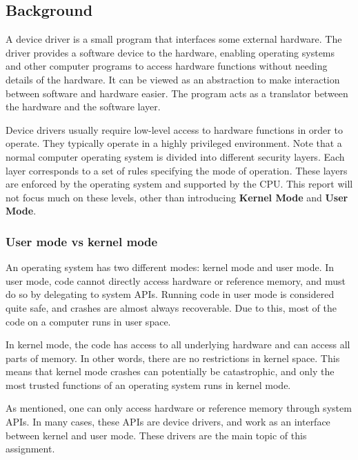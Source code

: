 \subsection{Background}
A device driver is a small program that interfaces some external hardware. The driver provides a software device to the hardware, enabling operating systems and other computer programs to access hardware functions without needing details of the hardware. It can be viewed as an abstraction to make interaction between software and hardware easier. The program acts as a translator between the hardware and the software layer. 

Device drivers usually require low-level access to hardware functions in order to operate. They typically operate in a highly privileged environment. Note that a normal computer operating system is divided into different security layers. Each layer corresponds to a set of rules specifying the mode of operation. These layers are enforced by the operating system and supported by the CPU. This report will not focus much on these levels, other than introducing {\bf Kernel Mode} and {\bf User Mode}\cite{linux}. 

\subsubsection{User mode vs kernel mode}
An operating system has two different modes: kernel mode and user mode. In user mode, code cannot directly access hardware or reference memory, and must do so by delegating to system APIs. Running code in user mode is considered quite safe, and crashes are almost always recoverable. Due to this, most of the code on a computer runs in user space. 

In kernel mode, the code has access to all underlying hardware and can access all parts of memory. In other words, there are no restrictions in kernel space. This means that kernel mode crashes can potentially be catastrophic, and only the most trusted functions of an operating system runs in kernel mode. 

As mentioned, one can only access hardware or reference memory through system APIs. In many cases, these APIs are device drivers, and work as an interface between kernel and user mode. These drivers are the main topic of this assignment.



